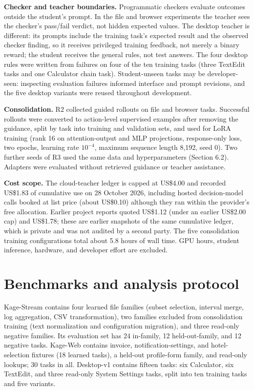 \documentclass[
  10pt,
]{article}
\begin{document}
\textbf{Checker and teacher boundaries.} Programmatic checkers evaluate
outcomes outside the student's prompt. In the file and browser
experiments the teacher sees the checker's pass/fail verdict, not hidden
expected values. The desktop teacher is different: its prompts include
the training task's expected result and the observed checker finding, so
it receives privileged training feedback, not merely a binary reward;
the student receives the general rules, not test answers. The four
desktop rules were written from failures on four of the ten training
tasks (three TextEdit tasks and one Calculator chain task).
Student-unseen tasks may be developer-seen: inspecting evaluation
failures informed interface and prompt revisions, and the five desktop
variants were reused throughout development.

\textbf{Consolidation.} R2 collected guided rollouts on file and browser
tasks. Successful rollouts were converted to action-level supervised
examples after removing the guidance, split by task into training and
validation sets, and used for LoRA training (rank 16 on attention-output
and MLP projections, response-only loss, two epochs, learning rate
\(10^{-4}\), maximum sequence length 8,192, seed 0). Two further seeds
of R3 used the same data and hyperparameters (Section 6.2). Adapters
were evaluated without retrieved guidance or teacher assistance.

\textbf{Cost scope.} The cloud-teacher ledger is capped at US\$4.00 and
recorded US\$1.83 of cumulative use on 28 October 2026, including hosted
decision-model calls booked at list price (about US\$0.10) although they
ran within the provider's free allocation. Earlier project reports
quoted US\$1.12 (under an earlier US\$2.00 cap) and US\$1.78; these are
earlier snapshots of the same cumulative ledger, which is private and
was not audited by a second party. The five consolidation training
configurations total about 5.8 hours of wall time. GPU hours, student
inference, hardware, and developer effort are excluded.

\section{Benchmarks and analysis
protocol}\label{benchmarks-and-analysis-protocol}

Kage-Stream contains four learned file families (subset selection,
interval merge, log aggregation, CSV transformation), two families
excluded from consolidation training (text normalization and
configuration migration), and three read-only negative families. Its
evaluation set has 24 in-family, 12 held-out-family, and 12 negative
tasks. Kage-Web contains invoice, notification-settings, and
hotel-selection fixtures (18 learned tasks), a held-out profile-form
family, and read-only lookups; 30 tasks in all. Desktop-v1 contains
fifteen tasks: six Calculator, six TextEdit, and three read-only System
Settings tasks, split into ten training tasks and five variants.
\end{document}
